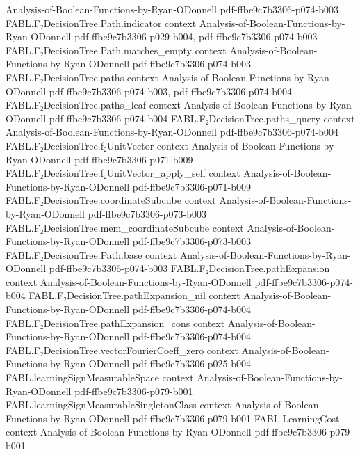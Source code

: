 \begin{theorem}
  {Analysis-of-Boolean-Functions-by-Ryan-ODonnell}
  {pdf-ffbe9c7b3306-p074-b003}
\proofstep
  {FABL.F₂DecisionTree.Path.indicator}
  {context}
  {Analysis-of-Boolean-Functions-by-Ryan-ODonnell}
  {pdf-ffbe9c7b3306-p029-b004,
    pdf-ffbe9c7b3306-p074-b003}
\proofstep
  {FABL.F₂DecisionTree.Path.matches_empty}
  {context}
  {Analysis-of-Boolean-Functions-by-Ryan-ODonnell}
  {pdf-ffbe9c7b3306-p074-b003}
\proofstep
  {FABL.F₂DecisionTree.paths}
  {context}
  {Analysis-of-Boolean-Functions-by-Ryan-ODonnell}
  {pdf-ffbe9c7b3306-p074-b003,
    pdf-ffbe9c7b3306-p074-b004}
\proofstep
  {FABL.F₂DecisionTree.paths_leaf}
  {context}
  {Analysis-of-Boolean-Functions-by-Ryan-ODonnell}
  {pdf-ffbe9c7b3306-p074-b004}
\proofstep
  {FABL.F₂DecisionTree.paths_query}
  {context}
  {Analysis-of-Boolean-Functions-by-Ryan-ODonnell}
  {pdf-ffbe9c7b3306-p074-b004}
\proofstep
  {FABL.F₂DecisionTree.f₂UnitVector}
  {context}
  {Analysis-of-Boolean-Functions-by-Ryan-ODonnell}
  {pdf-ffbe9c7b3306-p071-b009}
\proofstep
  {FABL.F₂DecisionTree.f₂UnitVector_apply_self}
  {context}
  {Analysis-of-Boolean-Functions-by-Ryan-ODonnell}
  {pdf-ffbe9c7b3306-p071-b009}
\proofstep
  {FABL.F₂DecisionTree.coordinateSubcube}
  {context}
  {Analysis-of-Boolean-Functions-by-Ryan-ODonnell}
  {pdf-ffbe9c7b3306-p073-b003}
\proofstep
  {FABL.F₂DecisionTree.mem_coordinateSubcube}
  {context}
  {Analysis-of-Boolean-Functions-by-Ryan-ODonnell}
  {pdf-ffbe9c7b3306-p073-b003}
\proofstep
  {FABL.F₂DecisionTree.Path.base}
  {context}
  {Analysis-of-Boolean-Functions-by-Ryan-ODonnell}
  {pdf-ffbe9c7b3306-p074-b003}
\proofstep
  {FABL.F₂DecisionTree.pathExpansion}
  {context}
  {Analysis-of-Boolean-Functions-by-Ryan-ODonnell}
  {pdf-ffbe9c7b3306-p074-b004}
\proofstep
  {FABL.F₂DecisionTree.pathExpansion_nil}
  {context}
  {Analysis-of-Boolean-Functions-by-Ryan-ODonnell}
  {pdf-ffbe9c7b3306-p074-b004}
\proofstep
  {FABL.F₂DecisionTree.pathExpansion_cons}
  {context}
  {Analysis-of-Boolean-Functions-by-Ryan-ODonnell}
  {pdf-ffbe9c7b3306-p074-b004}
\proofstep
  {FABL.F₂DecisionTree.vectorFourierCoeff_zero}
  {context}
  {Analysis-of-Boolean-Functions-by-Ryan-ODonnell}
  {pdf-ffbe9c7b3306-p025-b004}
\proofstep
  {FABL.learningSignMeasurableSpace}
  {context}
  {Analysis-of-Boolean-Functions-by-Ryan-ODonnell}
  {pdf-ffbe9c7b3306-p079-b001}
\proofstep
  {FABL.learningSignMeasurableSingletonClass}
  {context}
  {Analysis-of-Boolean-Functions-by-Ryan-ODonnell}
  {pdf-ffbe9c7b3306-p079-b001}
\proofstep
  {FABL.LearningCost}
  {context}
  {Analysis-of-Boolean-Functions-by-Ryan-ODonnell}
  {pdf-ffbe9c7b3306-p079-b001}
\proofstep

\end{theorem}

